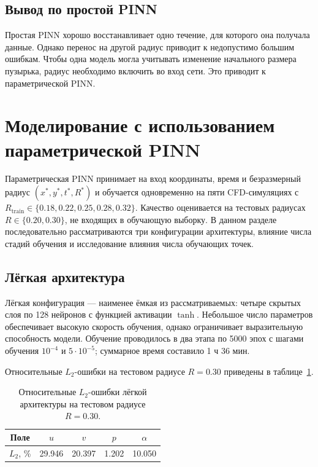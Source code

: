 \subsection{Вывод по простой PINN}

Простая PINN хорошо восстанавливает одно течение, для которого она получала
данные. Однако перенос на другой радиус приводит к недопустимо большим ошибкам.
Чтобы одна модель могла учитывать изменение начального размера пузырька,
радиус необходимо включить во вход сети. Это приводит к параметрической PINN.

\section{Моделирование с использованием параметрической PINN}

Параметрическая PINN принимает на вход координаты, время и безразмерный
радиус \((x^*,y^*,t^*,R^*)\) и обучается одновременно на пяти CFD-симуляциях
с \(R_{\mathrm{train}}\in\{0.18,0.22,0.25,0.28,0.32\}\). Качество оценивается
на тестовых радиусах \(R\in\{0.20,0.30\}\), не входящих в обучающую выборку.
В данном разделе последовательно рассматриваются три конфигурации архитектуры,
влияние числа стадий обучения и исследование влияния числа обучающих точек.

\subsection{Лёгкая архитектура}

Лёгкая конфигурация --- наименее ёмкая из рассматриваемых: четыре скрытых
слоя по 128 нейронов с функцией активации \(\tanh\). Небольшое число
параметров обеспечивает высокую скорость обучения, однако ограничивает
выразительную способность модели. Обучение проводилось в два этапа по 5000
эпох с шагами обучения \(10^{-4}\) и \(5\cdot10^{-5}\); суммарное время
составило 1 ч 36 мин.

Относительные \(L_2\)-ошибки на тестовом радиусе \(R=0.30\) приведены в
таблице~\ref{tab:light_errors}.

\begin{table}[H]
    \centering
    \caption{Относительные \(L_2\)-ошибки лёгкой архитектуры на тестовом радиусе \(R=0.30\).}
    \label{tab:light_errors}
    \begin{tabular}{c|cccc}
        \hline
        Поле & \(u\) & \(v\) & \(p\) & \(\alpha\) \\
        \hline
        \(L_2\), \% & 29.946 & 20.397 & 1.202 & 10.050 \\
        \hline
    \end{tabular}
\end{table}

